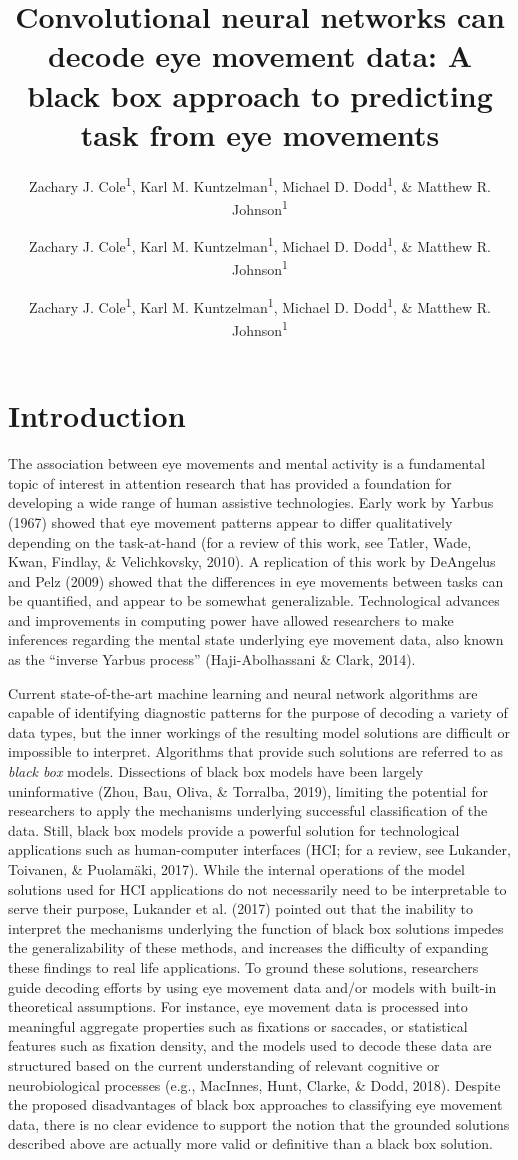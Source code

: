 \documentclass[
  english,
  man, donotrepeattitle,floatsintext]{apa6}
\author{Zachary J. Cole\textsuperscript{1}, Karl M. Kuntzelman\textsuperscript{1}, Michael D. Dodd\textsuperscript{1}, \& Matthew R. Johnson\textsuperscript{1}}
\affiliation{
\vspace{0.5cm}
\textsuperscript{1} University of Nebraska-Lincoln}
\author{Zachary J. Cole\textsuperscript{1}, Karl M. Kuntzelman\textsuperscript{1}, Michael D. Dodd\textsuperscript{1}, \& Matthew R. Johnson\textsuperscript{1}}
\affiliation{
\vspace{0.5cm}
\textsuperscript{1} University of Nebraska-Lincoln}
\title{Convolutional neural networks can decode eye movement data: A black box approach to predicting task from eye movements}
\date{}
\author{Zachary J. Cole\textsuperscript{1}, Karl M. Kuntzelman\textsuperscript{1}, Michael D. Dodd\textsuperscript{1}, \& Matthew R. Johnson\textsuperscript{1}}
\date{}
\date{}
\begin{document}
\maketitle

\section{Introduction}

The association between eye movements and mental activity is a fundamental topic of interest in attention research that has provided a foundation for developing a wide range of human assistive technologies. Early work by Yarbus (1967) showed that eye movement patterns appear to differ qualitatively depending on the task-at-hand (for a review of this work, see Tatler, Wade, Kwan, Findlay, \& Velichkovsky, 2010). A replication of this work by DeAngelus and Pelz (2009) showed that the differences in eye movements between tasks can be quantified, and appear to be somewhat generalizable. Technological advances and improvements in computing power have allowed researchers to make inferences regarding the mental state underlying eye movement data, also known as the \enquote{inverse Yarbus process} (Haji-Abolhassani \& Clark, 2014).

Current state-of-the-art machine learning and neural network algorithms are capable of identifying diagnostic patterns for the purpose of decoding a variety of data types, but the inner workings of the resulting model solutions are difficult or impossible to interpret. Algorithms that provide such solutions are referred to as \emph{black box} models. Dissections of black box models have been largely uninformative (Zhou, Bau, Oliva, \& Torralba, 2019), limiting the potential for researchers to apply the mechanisms underlying successful classification of the data. Still, black box models provide a powerful solution for technological applications such as human-computer interfaces (HCI; for a review, see Lukander, Toivanen, \& Puolamäki, 2017). While the internal operations of the model solutions used for HCI applications do not necessarily need to be interpretable to serve their purpose, Lukander et al. (2017) pointed out that the inability to interpret the mechanisms underlying the function of black box solutions impedes the generalizability of these methods, and increases the difficulty of expanding these findings to real life applications. To ground these solutions, researchers guide decoding efforts by using eye movement data and/or models with built-in theoretical assumptions. For instance, eye movement data is processed into meaningful aggregate properties such as fixations or saccades, or statistical features such as fixation density, and the models used to decode these data are structured based on the current understanding of relevant cognitive or neurobiological processes (e.g., MacInnes, Hunt, Clarke, \& Dodd, 2018). Despite the proposed disadvantages of black box approaches to classifying eye movement data, there is no clear evidence to support the notion that the grounded solutions described above are actually more valid or definitive than a black box solution.
\end{document}
